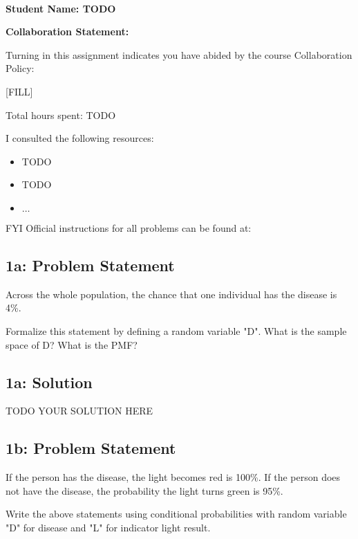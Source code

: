 \documentclass[12pt]{article}
\newcommand{\officialdirections}[1]{{\color{blue} #1}}
\begin{document}
~~\\ %

{\Large{\bf Student Name: TODO}}

{\Large{\bf Collaboration Statement:}}

Turning in this assignment indicates you have abided by the course Collaboration Policy:

[FILL] 

Total hours spent: TODO

I consulted the following resources:
\begin{itemize}
\item TODO
\item TODO
\item $\ldots$	
\end{itemize}

FYI Official instructions for all problems can be found at:


\tableofcontents

\newpage
\officialdirections{
\subsection*{1a: Problem Statement}

Across the whole population, the chance that one individual has the disease is 4\%. 

Formalize this statement by defining a random variable "D". What is the sample space of D? What is the PMF?
}

\subsection{1a: Solution}
TODO YOUR SOLUTION HERE

\newpage

\officialdirections{
\subsection*{1b: Problem Statement}

If the person has the disease, the light becomes red is 100\%.
If the person does not have the disease, the probability the light turns green is 95\%.

Write the above statements using conditional probabilities with random variable "D" for disease and "L" for indicator light result. 
}
\end{document}
